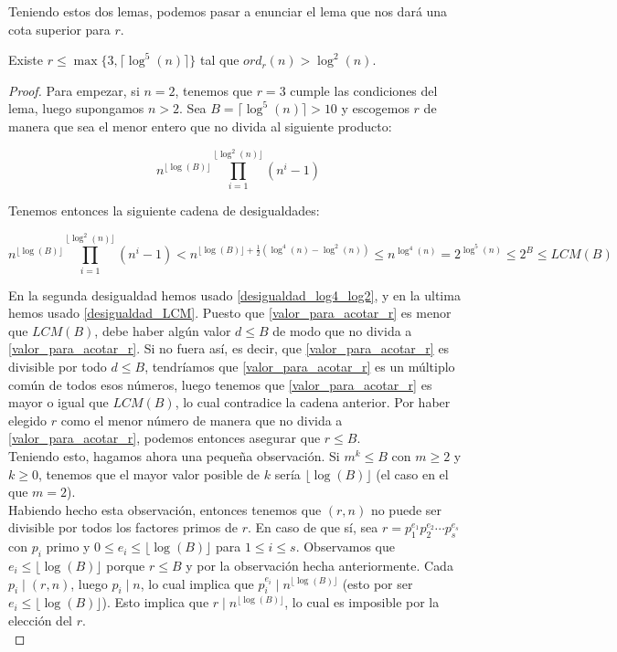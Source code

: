 Teniendo estos dos lemas, podemos pasar a enunciar el lema que nos dará una cota superior para $r$.

\begin{lema}\label{cota_superior_r_log5}
	Existe $r \leq \max\{3, \lceil \log^5(n) \rceil \}$ tal que $ord_r(n) > \log^2(n)$.
\end{lema}

\begin{proof}
	Para empezar, si $n = 2$, tenemos que $r = 3$ cumple las condiciones del lema, luego supongamos $n > 2$. Sea $B = \lceil \log^5(n) \rceil > 10$ y escogemos $r$ de manera que sea el menor entero que no divida al siguiente producto:
		
	\begin{equation}\label{valor_para_acotar_r}
	n^{\lfloor \log(B) \rfloor}\prod_{i=1}^{\lfloor \log^2(n) \rfloor}(n^i - 1)
	\end{equation}
	
	Tenemos entonces la siguiente cadena de desigualdades:
	
	\[ n^{\lfloor \log(B) \rfloor}\prod_{i=1}^{\lfloor \log^2(n) \rfloor}(n^i - 1) < n^{\lfloor \log(B) \rfloor + \frac{1}{2}(\log^4(n) - \log^2(n))} \leq n^{\log^4(n)} = 2^{\log^5(n)} \leq 2^B \leq LCM(B) \]
	
	En la segunda desigualdad hemos usado \autoref{desigualdad_log4_log2}, y en la ultima hemos usado \autoref{desigualdad_LCM}. Puesto que \eqref{valor_para_acotar_r} es menor que $LCM(B)$, debe haber algún valor $d \leq B$ de modo que no divida a \eqref{valor_para_acotar_r}. Si no fuera así, es decir, que \eqref{valor_para_acotar_r} es divisible por todo $d \leq B$, tendríamos que \eqref{valor_para_acotar_r} es un múltiplo común de todos esos números, luego tenemos que \eqref{valor_para_acotar_r} es mayor o igual que $LCM(B)$, lo cual contradice la cadena anterior. Por haber elegido $r$ como el menor número de manera que no divida a \eqref{valor_para_acotar_r}, podemos entonces asegurar que $r \leq B$.\\
	
	Teniendo esto, hagamos ahora una pequeña observación. Si $m^k \leq B$ con $m \geq 2$ y $k \geq 0$, tenemos que el mayor valor posible de $k$ sería $\lfloor \log(B) \rfloor$ (el caso en el que $m = 2$).\\
	
	Habiendo hecho esta observación, entonces tenemos que $(r, n)$ no puede ser divisible por todos los factores primos de $r$. En caso de que sí, sea $r = p_1^{e_1}p_2^{e_2}\dotsm p_s^{e_s}$ con $p_i$ primo y $0 \leq e_i \leq \lfloor \log(B) \rfloor$ para $1 \leq i \leq s$. Observamos que $e_i \leq \lfloor \log(B) \rfloor$ porque $r \leq B$ y por la observación hecha anteriormente. Cada $p_i \mid (r, n)$, luego $p_i \mid n$, lo cual implica que $p_i^{e_i} \mid n^{\lfloor \log(B) \rfloor}$ (esto por ser $e_i \leq \lfloor \log(B) \rfloor$). Esto implica que $r \mid n^{\lfloor \log(B) \rfloor}$, lo cual es imposible por la elección del $r$.\\
	

\end{proof}
